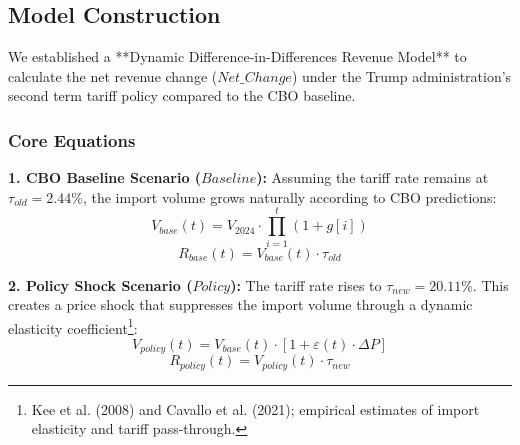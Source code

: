 \documentclass{apmcmthesis}
\begin{document}
\subsection{Model Construction}
We established a **Dynamic Difference-in-Differences Revenue Model** to calculate the net revenue change ($Net\_Change$) under the Trump administration's second term tariff policy compared to the CBO baseline.

\subsubsection{Core Equations}
\textbf{1. CBO Baseline Scenario ($Baseline$):} Assuming the tariff rate remains at $\tau_{old} = 2.44\%$, the import volume grows naturally according to CBO predictions:
\begin{equation}
    V_{base}(t) = V_{2024} \cdot \prod_{i=1}^{t} (1 + g[i])
\end{equation}
\begin{equation}
    R_{base}(t) = V_{base}(t) \cdot \tau_{old}
\end{equation}

\textbf{2. Policy Shock Scenario ($Policy$):} The tariff rate rises to $\tau_{new} = 20.11\%$. This creates a price shock that suppresses the import volume through a dynamic elasticity coefficient\footnote{\cite{Kee2008, Cavallo2021} Kee et al. (2008) and Cavallo et al. (2021); empirical estimates of import elasticity and tariff pass-through.}:
\begin{equation}
    V_{policy}(t) = V_{base}(t) \cdot [1 + \varepsilon(t) \cdot \Delta P]
\end{equation}
\begin{equation}
    R_{policy}(t) = V_{policy}(t) \cdot \tau_{new}
\end{equation}
\end{document}
